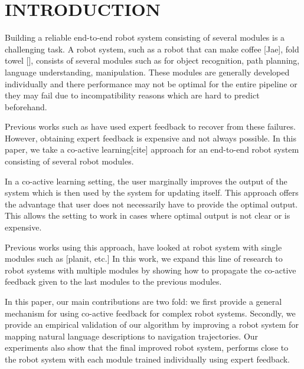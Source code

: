 \section{INTRODUCTION}

Building a reliable end-to-end robot system consisting of several modules is a challenging task.
A robot system, such as a robot that can make coffee [Jae], fold towel [], consists of several
modules such as for object recognition, path planning, language understanding, manipulation. These modules
are generally developed individually and there performance may not be optimal for the entire pipeline or they may fail due to incompatibility reasons which are hard to predict beforehand.

Previous works such as \cite{abeel helicopter} have used expert feedback to recover from these failures. However, obtaining expert feedback is expensive and not always possible. In this paper, we take a co-active learning[cite] approach for an end-to-end robot system consisting of several robot modules. 

In a co-active learning setting, the user marginally improves the output of the system which is then used by the system for updating itself. This approach offers the advantage that user does not necessarily have to provide the optimal output. This allows the setting to work in cases where optimal output is not clear or is expensive. 

Previous works using this approach, have looked at robot system with single modules such as [planit, etc.] 
In this work, we expand this line of research to robot systems with multiple modules by showing how to propagate the co-active feedback given to the last modules to the previous modules.


In this paper, our main contributions are two fold: we first provide a general mechanism
for using co-active feedback for complex robot systems. Secondly, we provide an empirical validation of 
our algorithm by improving a robot system for mapping natural language descriptions to navigation  trajectories. Our experiments also show that the final improved robot system, performs close to the robot system with each module trained individually using expert feedback.

